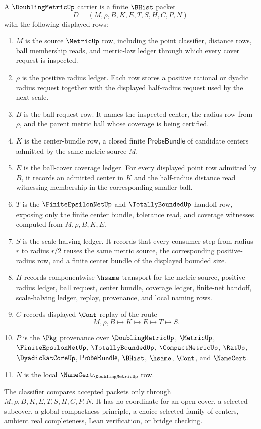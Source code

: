 \begin{definition}
\label{def:doubling-metric-carrier}
A $\DoublingMetricUp$ carrier is a finite $\BHist$ packet
$$
D=(M,\rho,B,K,E,T,S,H,C,P,N)
$$
with the following displayed rows:
\begin{enumerate}
\item $M$ is the source $\MetricUp$ row, including the point classifier, distance rows, ball membership reads, and metric-law ledger through which every cover request is inspected.
\item $\rho$ is the positive radius ledger. Each row stores a positive rational or dyadic radius request together with the displayed half-radius request used by the next scale.
\item $B$ is the ball request row. It names the inspected center, the radius row from $\rho$, and the parent metric ball whose coverage is being certified.
\item $K$ is the center-bundle row, a closed finite $\mathsf{ProbeBundle}$ of candidate centers admitted by the same metric source $M$.
\item $E$ is the ball-cover coverage ledger. For every displayed point row admitted by $B$, it records an admitted center in $K$ and the half-radius distance read witnessing membership in the corresponding smaller ball.
\item $T$ is the $\FiniteEpsilonNetUp$ and $\TotallyBoundedUp$ handoff row, exposing only the finite center bundle, tolerance read, and coverage witnesses computed from $M,\rho,B,K,E$.
\item $S$ is the scale-halving ledger. It records that every consumer step from radius $r$ to radius $r/2$ reuses the same metric source, the corresponding positive-radius row, and a finite center bundle of the displayed bounded size.
\item $H$ records componentwise $\hsame$ transport for the metric source, positive radius ledger, ball request, center bundle, coverage ledger, finite-net handoff, scale-halving ledger, replay, provenance, and local naming rows.
\item $C$ records displayed $\Cont$ replay of the route
$$
M,\rho,B \longmapsto K \longmapsto E \longmapsto T \longmapsto S .
$$
\item $P$ is the $\Pkg$ provenance over $\DoublingMetricUp$, $\MetricUp$, $\FiniteEpsilonNetUp$, $\TotallyBoundedUp$, $\CompactMetricUp$, $\RatUp$, $\DyadicRatCoreUp$, $\mathsf{ProbeBundle}$, $\BHist$, $\hsame$, $\Cont$, and $\NameCert$.
\item $N$ is the local $\NameCert_{\DoublingMetricUp}$ row.
\end{enumerate}
The classifier compares accepted packets only through $M,\rho,B,K,E,T,S,H,C,P,N$. It has no coordinate for an open cover, a selected subcover, a global compactness principle, a choice-selected family of centers, ambient real completeness, Lean verification, or bridge checking.
\end{definition}

